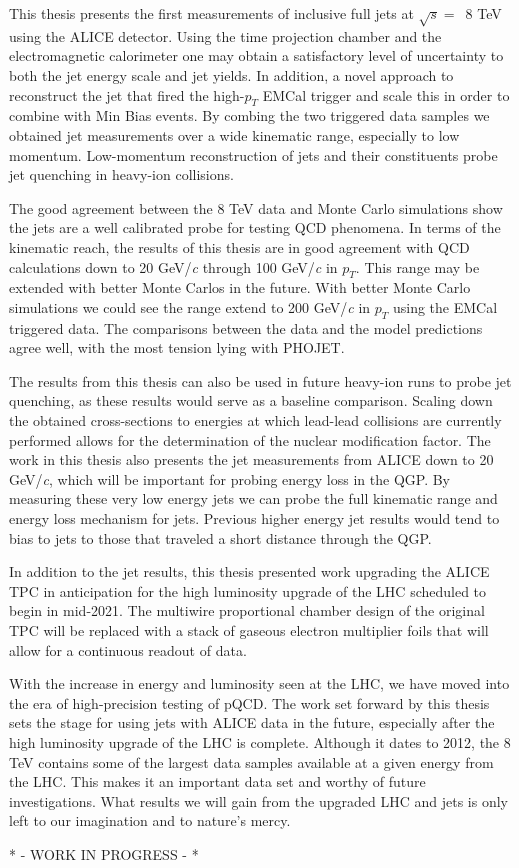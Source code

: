 This thesis presents the first measurements of inclusive full jets at $\sqrt{s} = \,$ 8 TeV using the ALICE detector.  Using the time projection chamber and the electromagnetic calorimeter one may obtain a satisfactory level of uncertainty to both the jet energy scale and jet yields.  In addition, a novel approach to reconstruct the jet that fired the high-$p_{T}$ EMCal trigger and scale this in order to combine with Min Bias events.  By combing the two triggered data samples we obtained jet measurements over a wide kinematic range, especially to low momentum.  Low-momentum reconstruction of jets and their constituents probe jet quenching in heavy-ion collisions.

The good agreement between the 8 TeV data and Monte Carlo simulations show the jets are a well calibrated probe for testing QCD phenomena.  In terms of the kinematic reach, the results of this thesis are in good agreement with QCD calculations down to 20 GeV/\textit{c} through 100 GeV/\textit{c} in $p_{T}$.  This range may be extended with better Monte Carlos in the future.  With better Monte Carlo simulations we could see the range extend to 200 GeV/\textit{c} in $p_{T}$ using the EMCal triggered data.  The comparisons between the data and the model predictions agree well, with the most tension lying with PHOJET.  

The results from this thesis can also be used in future heavy-ion runs to probe jet quenching, as these results would serve as a baseline comparison.   Scaling down the obtained cross-sections to energies at which lead-lead collisions are currently performed allows for the determination of the nuclear modification factor.  The work in this thesis also presents the jet measurements from ALICE down to 20 GeV/\textit{c}, which will be important for probing energy loss in the QGP.  By measuring these very low energy jets we can probe the full kinematic range and energy loss mechanism for jets.  Previous higher energy jet results would tend to bias to jets to those that traveled a short distance through the QGP.

In addition to the jet results, this thesis presented work upgrading the ALICE TPC in anticipation for the high luminosity upgrade of the LHC scheduled to begin in mid-2021.  The multiwire proportional chamber design of the original TPC will be replaced with a stack of gaseous electron multiplier foils that will allow for a continuous readout of data.

With the increase in energy and luminosity seen at the LHC, we have moved into the era of high-precision testing of pQCD.  The work set forward by this thesis sets the stage for using jets with ALICE data in the future, especially after the high luminosity upgrade of the LHC is complete.  Although it dates to 2012, the 8 TeV contains some of the largest data samples available at a given energy from the LHC.  This makes it an important data set and worthy of future investigations.  What results we will gain from the upgraded LHC and jets is only left to our imagination and to nature's mercy.



* - WORK IN PROGRESS - *